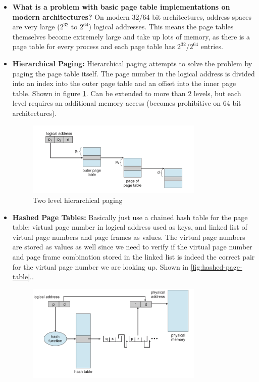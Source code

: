 \documentclass[12pt]{article}
\begin{document}
\begin{itemize}
    \item \textbf{What is a problem with basic page table implementations on modern architectures?} On modern 32/64 bit architectures, address spaces are very large (\(2^{32}\) to \(2^{64}\)) logical addresses. This means the page tables themselves become extremely large and take up lots of memory, as there is a page table for every process and each page table has \(2^{32}\)/\(2^{64}\) entries.
    \item \textbf{Hierarchical Paging:} Hierarchical paging attempts to solve the problem by paging the page table itself. The page number in the logical address is divided into an index into the outer page table and an offset into the inner page table. Shown in figure \ref{fig:hierarchical-paging}. Can be extended to more than 2 levels, but each level requires an additional memory access (becomes prohibitive on 64 bit architectures).
        \begin{figure}[ht]
            \centering
            \includegraphics[width=0.8\textwidth]{figures/hierarchical-paging.jpg}
            \caption{Two level hierarchical paging}
            \label{fig:hierarchical-paging}
        \end{figure}
    \item \textbf{Hashed Page Tables:} Basically just use a chained hash table for the page table: virtual page number in logical address used as keys, and linked list of virtual page numbers and page frames as values. The virtual page numbers are stored as values as well since we need to verify if the virtual page number and page frame combination stored in the linked list is indeed the correct pair for the virtual page number we are looking up. Shown in \ref{fig:hashed-page-table}..
        \begin{figure}[ht]
            \centering
            \includegraphics[width=0.8\textwidth]{figures/hashed-page-table.jpg}

\end{figure}
\end{itemize}
\end{document}
